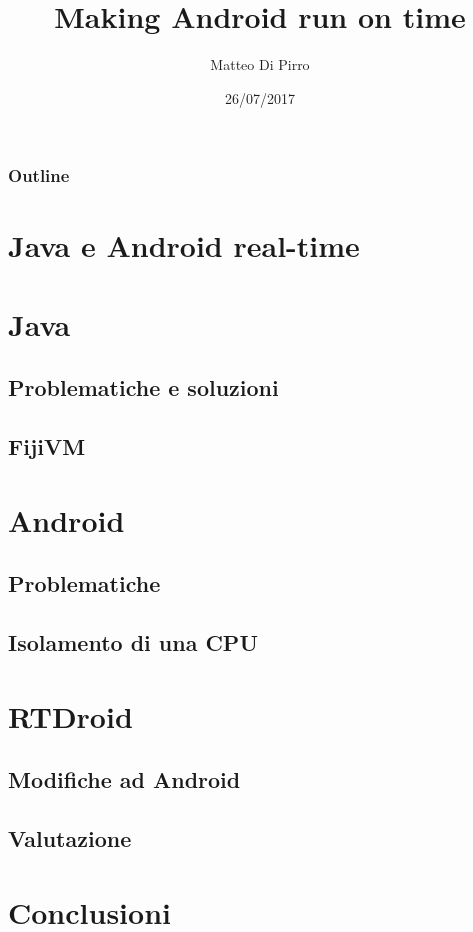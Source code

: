 \documentclass{beamer}
\title{Making Android run on time}
\subtitle{ }
\author{Matteo Di Pirro}
\date{26/07/2017}
\institute{Università degli Studi di Padova}
\begin{document}
\newcommand{\turnOffNumbers}{true} %

\begin{frame}[noframenumbering]
\titlepage
\end{frame}

\let\turnOffNumbers\empty
\begin{frame}
	\frametitle{Outline}
	\tableofcontents
\end{frame}

\section{Java e Android real-time}


\section{Java}
\subsection{Problematiche e soluzioni}


\subsection{FijiVM}




\section{Android}
\subsection{Problematiche}



\subsection{Isolamento di una CPU}




\section{RTDroid}

\subsection{Modifiche ad Android}



%
%
%
\subsection{Valutazione}


\section{Conclusioni}
%


\appendix
\makethanks
\renewcommand{\turnOffNumbers}{true} %
\end{document}
